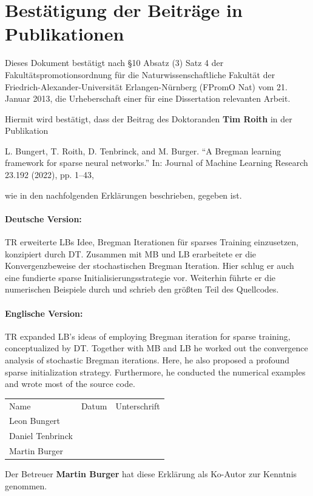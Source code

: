 \documentclass[12pt]{article}
\begin{document}
\section*{Bestätigung der Beiträge in Publikationen}

Dieses Dokument bestätigt nach \S10 Absatz (3) Satz 4 der Fakultätspromotionsordnung für die Naturwissenschaftliche Fakultät der
Friedrich-Alexander-Universität Erlangen-Nürnberg (FPromO Nat) vom 21. Januar 2013, die Urheberschaft einer für eine Dissertation relevanten Arbeit.\par

\vspace{15pt}
\noindent
Hiermit wird bestätigt, dass der Beitrag des Doktoranden \textbf{Tim Roith} in der Publikation
%
\begin{center}
L. Bungert, T. Roith, D. Tenbrinck, and M. Burger. “A Bregman learning
framework for sparse neural networks.” In: Journal of Machine Learning
Research 23.192 (2022), pp. 1–43,
\end{center}
%
wie in den nachfolgenden Erklärungen beschrieben, gegeben ist.

\paragraph{Deutsche Version:} TR erweiterte LBs Idee, Bregman Iterationen für sparses Training einzusetzen, konzipiert durch DT. Zusammen mit MB und LB erarbeitete er die Konvergenzbeweise der stochastischen Bregman Iteration. Hier schlug er auch eine fundierte sparse Initialisierungsstrategie vor. Weiterhin führte er die numerischen Beispiele durch und schrieb den größten Teil des Quellcodes.

\paragraph{Englische Version:} TR expanded LB's ideas of employing Bregman iteration for sparse training, conceptualized by DT. Together with MB and LB he worked out the convergence analysis of stochastic Bregman iterations. Here, he also proposed a profound sparse initialization strategy. Furthermore, he conducted the numerical examples and wrote most of the source code.
\vspace{50pt}

\renewcommand{\arraystretch}{4}
\begin{tabular}{l l l}
Name & Datum & Unterschrift\\
Leon Bungert & \raisebox{-3pt}{\makebox[5cm]{.\dotfill}} & \raisebox{-3pt}{\makebox[5cm]{.\dotfill}}\\
%
Daniel Tenbrinck & \raisebox{-3pt}{\makebox[5cm]{.\dotfill}} & \raisebox{-3pt}{\makebox[5cm]{.\dotfill}}\\
Martin Burger & \raisebox{-3pt}{\makebox[5cm]{.\dotfill}} & \raisebox{-3pt}{\makebox[5cm]{.\dotfill}}\\
\end{tabular}%
%
\vspace{50pt}

Der Betreuer \textbf{Martin Burger} hat diese Erklärung als Ko-Autor zur Kenntnis genommen.

 
\end{document}
